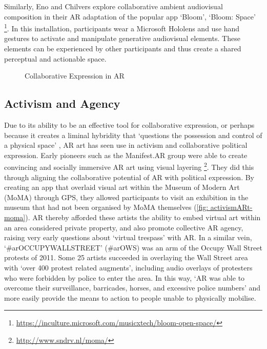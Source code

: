 Similarly, Eno and Chilvers explore collaborative ambient audiovisual composition in their AR adaptation of the popular app `Bloom', `Bloom: Space' \footnote{\url{https://inculture.microsoft.com/musicxtech/bloom-open-space/}}. In this installation, participants wear a Microsoft Hololens and use hand gestures to activate and manipulate generative audiovisual elements. These elements can be experienced by other participants and thus create a shared perceptual and actionable space.

\begin{figure}
    \centering
    \hfill
    \caption{Collaborative Expression in AR}
    \label{fig: collaborativeARt}
\end{figure}

\subsection{Activism and Agency}\label{sec: literature-arts-activism}
Due to its ability to be an effective tool for collaborative expression, or perhaps because it creates a liminal hybridity that `questions the possession and control of a physical space' \citep{thiel2018}, AR art has seen use in activism and collaborative political expression. Early pioneers such as the Manifest.AR group were able to create convincing and socially immersive AR art using visual layering \footnote{\url{http://www.sndrv.nl/moma/}}. They did this through aligning the collaborative potential of AR with political expression. By creating an app that overlaid visual art within the Museum of Modern Art (MoMA) through GPS, they allowed participants to visit an exhibition in the museum that had not been organised by MoMA themselves (\autoref{fig: activismARt-moma}). AR thereby afforded these artists the ability to embed virtual art within an area considered private property, and also promote collective AR agency, raising very early questions about `virtual trespass' with AR. In a similar vein, `\#arOCCUPYWALLSTREET' (\#arOWS) was an arm of the Occupy Wall Street protests of 2011. Some 25 artists succeeded in overlaying the Wall Street area with `over 400 protest related augments', including audio overlays of protesters who were forbidden by police to enter the area. In this way, `AR was able to overcome their surveillance, barricades, horses, and excessive police numbers' \citeyearpar{skwarek2018} and more easily provide the means to action to people unable to physically mobilise.


